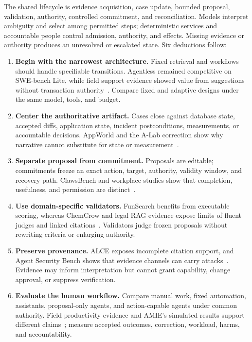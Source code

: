 The shared lifecycle is evidence acquisition, case update, bounded proposal, validation, authority, controlled commitment, and reconciliation. Models interpret ambiguity and select among permitted steps; deterministic services and accountable people control admission, authority, and effects. Missing evidence or authority produces an unresolved or escalated state. Six deductions follow:
\begin{enumerate}
    \item \textbf{Begin with the narrowest architecture.} Fixed retrieval and workflows should handle specifiable transitions. Agentless remained competitive on SWE-bench Lite, while field support evidence showed value from suggestions without transaction authority~\cite{xia2024agentless,brynjolfsson2025generativeaiatwork}. Compare fixed and adaptive designs under the same model, tools, and budget.
    \item \textbf{Center the authoritative artifact.} Cases close against database state, accepted diffs, application state, incident postconditions, measurements, or accountable decisions. AppWorld and the A-Lab correction show why narrative cannot substitute for state or measurement~\cite{trivedi2024appworld,szymanski2026alabcorrection}.
    \item \textbf{Separate proposal from commitment.} Proposals are editable; commitments freeze an exact action, target, authority, validity window, and recovery path. ClawsBench and workplace studies show that completion, usefulness, and permission are distinct~\cite{li2026clawsbench,brynjolfsson2025generativeaiatwork,dillon2025shiftingwork}.
    \item \textbf{Use domain-specific validators.} FunSearch benefits from executable scoring, whereas ChemCrow and legal RAG evidence expose limits of fluent judges and linked citations~\cite{romeraparedes2024funsearch,bran2024chemcrow,magesh2025legalrag}. Validators judge frozen proposals without rewriting criteria or enlarging authority.
    \item \textbf{Preserve provenance.} ALCE exposes incomplete citation support, and Agent Security Bench shows that evidence channels can carry attacks~\cite{gao2023alce,zhang2024agentsecuritybench}. Evidence may inform interpretation but cannot grant capability, change approval, or suppress verification.
    \item \textbf{Evaluate the human workflow.} Compare manual work, fixed automation, assistants, proposal-only agents, and action-capable agents under common authority. Field productivity evidence and AMIE's simulated results support different claims~\cite{brynjolfsson2025generativeaiatwork,cui2026highskilledwork,tu2025amie}; measure accepted outcomes, correction, workload, harms, and accountability.
\end{enumerate}

